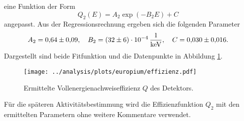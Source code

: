 eine Funktion der Form
\begin{equation*}
  Q_2(E)=A_2\exp\left(-B_2 E\right)+C
\end{equation*}
angepasst. Aus der Regressionsrechnung ergeben sich die folgenden Parameter
\begin{equation}
\label{eq:effizienz_Q_2}
A_2 = \num{0.64\pm0.09}, \quad B_2=\SI{32\pm6 e-4}{\per\kilo\eV}, \quad C = \num{0.030\pm0.016}.
\end{equation}
Dargestellt sind beide Fitfunktion und die Datenpunkte in Abbildung \ref{fig:effizienz}.
\begin{figure}
  \centering
  \texttt{[image: ../analysis/plots/europium/effizienz.pdf]}
  \caption{Ermittelte Vollenergienachweiseffizienz $Q$ des Detektors.}
  \label{fig:effizienz}
\end{figure}
Für die späteren Aktivitätsbestimmung wird die Effizienzfunktion $Q_2$ mit den
ermittelten Parametern ohne weitere Kommentare verwendet.
\FloatBarrier
